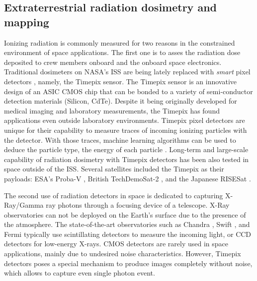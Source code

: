 \documentclass[a4paper,11pt,titlepage,twoside]{book}
\begin{document}

\subsection{Extraterrestrial radiation dosimetry and mapping}

Ionizing radiation is commonly measured for two reasons in the constrained environment of space applications.
The first one is to asses the radiation dose deposited to crew members onboard and the onboard space electronics.
Traditional dosimeters on NASA's \ac{ISS} are being lately replaced with \emph{smart} pixel detectors \cite{turecek2011small, stoffle2015timepix, pinsky2019timepix}, namely, the Timepix sensor.
The Timepix sensor \cite{llopart2007timepix, poikela2014timepix3} is an innovative design of an \ac{ASIC} \ac{CMOS} chip that can be bonded to a variety of semi-conductor detection materials (Silicon, CdTe).
Despite it being originally developed for medical imaging \cite{ballabriga2018asic} and laboratory measurements, the Timepix has found applications even outside laboratory environments.
Timepix pixel detectors are unique for their capability to measure traces of incoming ionizing particles with the detector.
With those traces, machine learning algorithms can be used to deduce the particle type, the energy of each particle \cite{granja2018resolving, baca2019timepix}.
Long-term and large-scale capability of radiation dosimetry with Timepix detectors has been also tested in space outside of the \ac{ISS}.
Several satellites included the Timepix as their payloads: ESA's Proba-V \cite{granja2014directional, granja2016satram}, British TechDemoSat-2 \cite{furnell2018first}, and the Japanese RISESat \cite{filgas2019risepix}.

The second use of radiation detectors in space is dedicated to capturing X-Ray/Gamma ray photons through a focusing device of a telescope.
X-Ray observatories can not be deployed on the Earth's surface due to the presence of the atmosphere.
The state-of-the-art observatories such as Chandra \cite{weisskopf2000chandra}, Swift \cite{gehrels2004swift}, and Fermi \cite{atwood2009large} typically use scintillating detectors to measure the incoming light, or \ac{CCD} detectors for low-energy X-rays.
\ac{CMOS} detectors are rarely used in space applications, mainly due to undesired noise characteristics.
However, Timepix detectors poses a special mechanism to produce images completely without noise, which allows to capture even single photon event.
\end{document}

